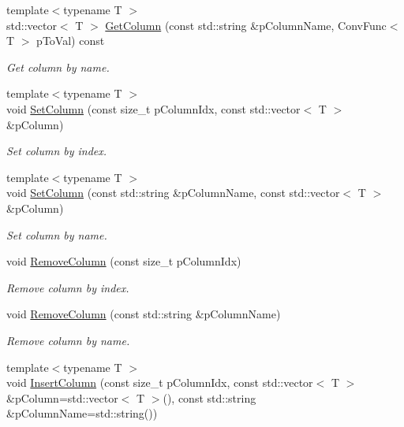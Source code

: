\begin{DoxyCompactItemize}
{\footnotesize template$<$typename T $>$ }\\std\+::vector$<$ T $>$ \hyperlink{classrapidcsv_1_1Document_ad92a31a92917afab0c35bc577a903b89}{Get\+Column} (const std\+::string \&p\+Column\+Name, Conv\+Func$<$ T $>$ p\+To\+Val) const
\begin{DoxyCompactList}\small\item\em Get column by name. \end{DoxyCompactList}\item 
{\footnotesize template$<$typename T $>$ }\\void \hyperlink{classrapidcsv_1_1Document_ae48da50147082a34218c193f93c57259}{Set\+Column} (const size\+\_\+t p\+Column\+Idx, const std\+::vector$<$ T $>$ \&p\+Column)
\begin{DoxyCompactList}\small\item\em Set column by index. \end{DoxyCompactList}\item 
{\footnotesize template$<$typename T $>$ }\\void \hyperlink{classrapidcsv_1_1Document_ab5dcf985afb50279580c751e0f7eec79}{Set\+Column} (const std\+::string \&p\+Column\+Name, const std\+::vector$<$ T $>$ \&p\+Column)
\begin{DoxyCompactList}\small\item\em Set column by name. \end{DoxyCompactList}\item 
void \hyperlink{classrapidcsv_1_1Document_a1e736e932b9162f74ce6188937099c7d}{Remove\+Column} (const size\+\_\+t p\+Column\+Idx)
\begin{DoxyCompactList}\small\item\em Remove column by index. \end{DoxyCompactList}\item 
void \hyperlink{classrapidcsv_1_1Document_acf7432447c7fd1308c3b30ebabea6440}{Remove\+Column} (const std\+::string \&p\+Column\+Name)
\begin{DoxyCompactList}\small\item\em Remove column by name. \end{DoxyCompactList}\item 
{\footnotesize template$<$typename T $>$ }\\void \hyperlink{classrapidcsv_1_1Document_a774353ea9ad58c3a8c63f8ff8aa44f69}{Insert\+Column} (const size\+\_\+t p\+Column\+Idx, const std\+::vector$<$ T $>$ \&p\+Column=std\+::vector$<$ T $>$(), const std\+::string \&p\+Column\+Name=std\+::string())

\end{DoxyCompactItemize}
